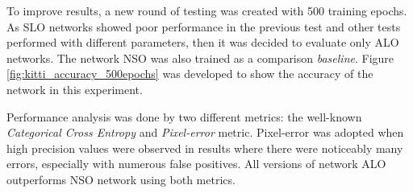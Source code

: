 To improve results, a new round of testing was created with 500 training epochs.
As SLO networks showed poor performance in the previous test and other tests performed with different parameters, then it was decided to evaluate only ALO networks.
The network NSO was also trained as a comparison \textit{baseline}.
Figure \ref{fig:kitti_accuracy_500epochs} was developed to show the accuracy of the network in this experiment.

% 

Performance analysis was done by two different metrics: the well-known \textit{Categorical Cross Entropy} and \textit{Pixel-error} metric.
Pixel-error was adopted when high precision values were observed in results where there were noticeably many errors, especially with numerous false positives.
All versions of network ALO outperforms NSO network using both metrics.

% 

